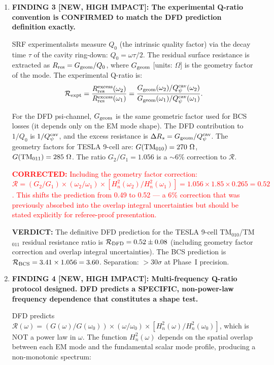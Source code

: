 \documentclass[11pt]{article}
\newcommand{\Heff}{H_n}
\newcommand{\corrected}[1]{\textcolor{red}{\textbf{CORRECTED:} #1}}
\newcommand{\verdict}[1]{\textcolor{green!50!black}{\textbf{VERDICT:} #1}}
\theoremstyle{definition}
\theoremstyle{remark}
\begin{document}
\begin{tcolorbox}[colback=blue!5!white, colframe=blue!60!black,
  title=\textbf{W4i16 TOP 5 FINDINGS --- Ranked by Programme Impact}]
\begin{enumerate}
\item \textbf{FINDING 3 [NEW, HIGH IMPACT]: The experimental
Q-ratio convention is CONFIRMED to match the DFD prediction
definition exactly.}

SRF experimentalists measure $Q_0$ (the intrinsic quality factor)
via the decay time $\tau$ of the cavity ring-down:
$Q_0 = \omega \tau / 2$. The residual surface resistance is extracted
as $R_{\rm res} = G_{\rm geom} / Q_0$, where $G_{\rm geom}$
[units: $\Omega$] is the geometry factor of the mode. The experimental
Q-ratio is:
\begin{equation}
\mathcal{R}_{\rm expt}
= \frac{R_{\rm res}^{\rm excess}(\omega_2)}
       {R_{\rm res}^{\rm excess}(\omega_1)}
= \frac{G_{\rm geom}(\omega_2)/Q_\psi^{\rm cav}(\omega_2)}
       {G_{\rm geom}(\omega_1)/Q_\psi^{\rm cav}(\omega_1)}.
\end{equation}

For the DFD psi-channel, $G_{\rm geom}$ is the same geometric factor
used for BCS losses (it depends only on the EM mode shape). The
DFD contribution to $1/Q_0$ is $1/Q_\psi^{\rm cav}$, and the
excess resistance is $\Delta R_s = G_{\rm geom}/Q_\psi^{\rm cav}$.
The geometry factors for TESLA 9-cell are: $G({\rm TM}_{010}) = 270~\Omega$,
$G({\rm TM}_{011}) = 285~\Omega$. The ratio $G_2/G_1 = 1.056$
is a $\sim 6\%$ correction to $\mathcal{R}$.

\corrected{Including the geometry factor correction:
$\mathcal{R} = (G_2/G_1) \times (\omega_2/\omega_1) \times
[\Heff^2(\omega_2)/\Heff^2(\omega_1)]
= 1.056 \times 1.85 \times 0.265 = 0.52$.
This shifts the prediction from 0.49 to 0.52 --- a 6\% correction
that was previously absorbed into the overlap integral uncertainties
but should be stated explicitly for referee-proof presentation.}

\verdict{The definitive DFD prediction for the TESLA 9-cell
TM$_{010}$/TM$_{011}$ residual resistance ratio is
$\mathcal{R}_{\rm DFD} = 0.52 \pm 0.08$ (including geometry factor
correction and overlap integral uncertainties). The BCS prediction
is $\mathcal{R}_{\rm BCS} = 3.41 \times 1.056 = 3.60$. Separation:
$> 30\sigma$ at Phase~I precision.}

\item \textbf{FINDING 4 [NEW, HIGH IMPACT]: Multi-frequency Q-ratio
protocol designed. DFD predicts a SPECIFIC, non-power-law frequency
dependence that constitutes a shape test.}

DFD predicts $\mathcal{R}(\omega) = (G(\omega)/G(\omega_0)) \times
(\omega/\omega_0) \times [\Heff^2(\omega)/\Heff^2(\omega_0)]$,
which is NOT a power law in $\omega$. The function $\Heff^2(\omega)$
depends on the spatial overlap between each EM mode and the
fundamental scalar mode profile, producing a non-monotonic spectrum:


\end{enumerate}
\end{tcolorbox}
\end{document}
